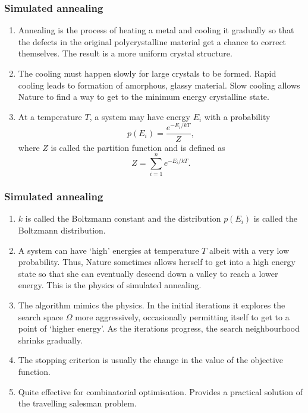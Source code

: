 \documentclass{beamer}
\begin{document}
\begin{frame}
\frametitle{Simulated annealing}
\begin{enumerate}
\item Annealing is the process of heating a metal and cooling it gradually so 
that the defects in the original polycrystalline material get a chance to 
correct themselves. The result is a more uniform crystal structure.
\item The cooling must happen slowly for large crystals to be formed. Rapid
cooling leads to formation of amorphous, glassy material. Slow cooling allows
Nature to find a way to get to the minimum energy crystalline state.
\item At a temperature $T$, a system may have energy $E_i$ with a probability
\begin{equation}\label{e2}
p(E_i) = \frac{e^{-E_i/kT}}{Z},
\end{equation}
where $Z$ is called the partition function and is defined as
\begin{equation}\label{e3}
Z = \sum_{i=1}^n e^{-E_i/kT}.
\end{equation}
\end{enumerate}
\end{frame}

\begin{frame}
\frametitle{Simulated annealing}
\begin{enumerate}
\item $k$ is called the Boltzmann constant and the distribution $p(E_i)$ is 
called the Boltzmann distribution.
\item A system can have `high' energies at temperature $T$ albeit with a very 
low probability. Thus, Nature sometimes allows herself to get into a high energy
state so that she can eventually descend down a valley to reach a lower energy.
This is the physics of simulated annealing.
\item The algorithm mimics the physics. In the initial iterations it explores 
the search space $\Omega$ more aggressively, occasionally permitting itself to 
get to a point of `higher energy'. As the iterations progress, the search 
neighbourhood shrinks gradually.
\item The stopping criterion is usually the change in the value of the objective
function.
\item Quite effective for combinatorial optimisation. Provides a practical 
solution of the travelling salesman problem.
\end{enumerate}
\end{frame}
\end{document}
